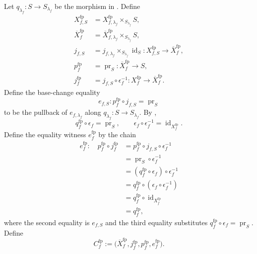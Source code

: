 \begin{definition}
\checked
  \label{def:nagata-final-basechanged-compactification}
  \lean{}

  Let $q_{\lambda_f}\colon S\to S_{\lambda_f}$ be the morphism in
  .  Define
  \[
  \begin{aligned}
    X_{f,S}^{\mathrm{fp}}
      &=X_{f,\lambda_f}^{\mathrm{fp}}
        \times_{S_{\lambda_f}}S,\\
    \overline X_f^{\mathrm{fp}}
      &=\overline X_{f,\lambda_f}^{\mathrm{fp}}
        \times_{S_{\lambda_f}}S,\\
    j_{f,S}
      &=j_{f,\lambda_f}\times_{S_{\lambda_f}}\operatorname{id}_S
        \colon X_{f,S}^{\mathrm{fp}}\to\overline X_f^{\mathrm{fp}},\\
    p_f^{\mathrm{fp}}
      &=\operatorname{pr}_S\colon\overline X_f^{\mathrm{fp}}\to S,\\
    j_f^{\mathrm{fp}}
      &=j_{f,S}\circ\epsilon_f^{-1}
        \colon X_f^{\mathrm{fp}}\to\overline X_f^{\mathrm{fp}}.
  \end{aligned}
  \]
  Define the base-change equality
  \[
    e_{f,S}\colon
      p_f^{\mathrm{fp}}\circ j_{f,S}=\operatorname{pr}_S
  \]
  to be the pullback of $e_{f,\lambda_f}$ along
  $q_{\lambda_f}\colon S\to S_{\lambda_f}$.  By
  ,
  \[
    q_f^{\mathrm{fp}}\circ\epsilon_f=\operatorname{pr}_S,
    \qquad
    \epsilon_f\circ\epsilon_f^{-1}
      =\operatorname{id}_{X_f^{\mathrm{fp}}}.
  \]
  Define the equality witness $e_f^{\mathrm{fp}}$ by the chain
  \[
  \begin{aligned}
    e_f^{\mathrm{fp}}\colon\quad
    p_f^{\mathrm{fp}}\circ j_f^{\mathrm{fp}}
      &=p_f^{\mathrm{fp}}\circ j_{f,S}\circ\epsilon_f^{-1}\\
      &=\operatorname{pr}_S\circ\epsilon_f^{-1}\\
      &=(q_f^{\mathrm{fp}}\circ\epsilon_f)\circ\epsilon_f^{-1}\\
      &=q_f^{\mathrm{fp}}\circ
        (\epsilon_f\circ\epsilon_f^{-1})\\
      &=q_f^{\mathrm{fp}}\circ
        \operatorname{id}_{X_f^{\mathrm{fp}}}\\
      &=q_f^{\mathrm{fp}},
  \end{aligned}
  \]
  where the second equality is $e_{f,S}$ and the third equality substitutes
  $q_f^{\mathrm{fp}}\circ\epsilon_f=\operatorname{pr}_S$.  Define
  \[
    C_f^{\mathrm{fp}}
      :=\bigl(\overline X_f^{\mathrm{fp}},j_f^{\mathrm{fp}},
        p_f^{\mathrm{fp}},e_f^{\mathrm{fp}}\bigr).
  \]
\end{definition}

